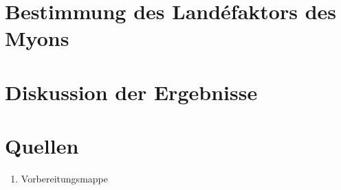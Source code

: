 \documentclass[a4paper,ngerman]{scrartcl}
\begin{document}
\section{Bestimmung des Landéfaktors des Myons}




\section{Diskussion der Ergebnisse}




\section{Quellen}
\begin{enumerate}
\item Vorbereitungsmappe 
\end{enumerate}
\end{document}
